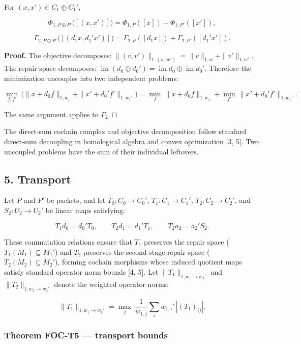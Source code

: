 \documentclass[
  11pt,
]{article}
\begin{document}
For \((x,x')\in C_1\oplus C_1'\),

\[
\Phi_{1,P\oplus P'}\bigl([(x,x')]\bigr)
=\Phi_{1,P}([x])+\Phi_{1,P'}([x']),
\]

\[
\Gamma_{2,P\oplus P'}\bigl([(d_1 x,d_1' x')]\bigr)
=\Gamma_{2,P}([d_1 x])+\Gamma_{2,P'}([d_1' x']).
\]

\textbf{Proof.} The objective decomposes: \(\|(v,v')\|_{1,(w,w')}=\|v\|_{1,w}+\|v'\|_{1,w'}\). The repair space decomposes: \(\operatorname{im}(d_0\oplus d_0')=\operatorname{im} d_0\oplus\operatorname{im} d_0'\). Therefore the minimization uncouples into two independent problems:

\[
\min_{f,f'}\,\bigl(\|x+d_0 f\|_{1,w_1}+\|x'+d_0' f'\|_{1,w_1'}\bigr)
=\min_f\,\|x+d_0 f\|_{1,w_1}+\min_{f'}\,\|x'+d_0' f'\|_{1,w_1'}.
\]

The same argument applies to \(\Gamma_2\). □

The direct-sum cochain complex and objective decomposition follow standard direct-sum decoupling in homological algebra and convex optimization {[}3, 5{]}. Two uncoupled problems have the sum of their individual leftovers.

\subsection{5. Transport}\label{transport}

Let \(P\) and \(P'\) be packets, and let \(T_0\colon C_0\to C_0'\), \(T_1\colon C_1\to C_1'\), \(T_2\colon C_2\to C_2'\), and \(S_2\colon U_2\to U_2'\) be linear maps satisfying:

\[
T_1 d_0 = d_0' T_0, \qquad T_2 d_1 = d_1' T_1, \qquad T_2 a_2 = a_2' S_2.
\]

These commutation relations ensure that \(T_1\) preserves the repair space (\(T_1(M_1)\subseteq M_1'\)) and \(T_2\) preserves the second-stage repair space (\(T_2(M_2)\subseteq M_2'\)), forming cochain morphisms whose induced quotient maps satisfy standard operator norm bounds {[}4, 5{]}. Let \(\|T_1\|_{1,w_1\to w_1'}\) and \(\|T_2\|_{1,w_2\to w_2'}\) denote the weighted operator norms:

\[
\|T_1\|_{1,w_1\to w_1'}
=\max_j\,\frac{1}{w_{1,j}}\sum_i w_{1,i}'\,|(T_1)_{ij}|.
\]

\subsubsection{Theorem FOC-T5 --- transport bounds}\label{theorem-foc-t5-transport-bounds}
\end{document}
